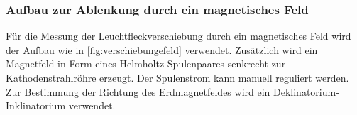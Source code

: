 \subsubsection{Aufbau zur Ablenkung durch ein magnetisches Feld}
Für die Messung der Leuchtfleckverschiebung durch ein magnetisches Feld wird der Aufbau wie
in \ref{fig:verschiebungefeld} verwendet. Zusätzlich wird ein Magnetfeld in Form eines
Helmholtz-Spulenpaares senkrecht zur Kathodenstrahlröhre erzeugt. Der Spulenstrom kann manuell
reguliert werden.
Zur Bestimmung der Richtung des Erdmagnetfeldes wird ein Deklinatorium-Inklinatorium
verwendet.
